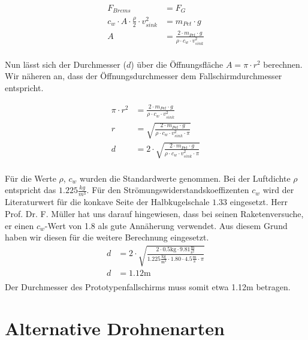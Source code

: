 \begin{equation}
\begin{split}
F_{Brems} &= F_{G} \\
c_{w} \cdot A \cdot \frac{\rho}{2} \cdot v_{sink}^{2} &= m_{Pet} \cdot g \\
A &= \frac{2 \cdot m_{Pet} \cdot g}{\rho \cdot c_{w} \cdot v_{sink}^{2} } \\
\end{split}
\end{equation}

Nun lässt sich der Durchmesser ($d$) über die Öffnungsfläche $A = \pi \cdot r^2$ berechnen. Wir näheren an, dass der Öffnungsdurchmesser dem Fallschirmdurchmesser entspricht. 

\begin{equation}
\begin{split}
\pi \cdot r^2 &= \frac{2 \cdot m_{Pet} \cdot g}{\rho \cdot c_{w} \cdot v_{sink}^{2} } \\
r &= \sqrt{\frac{2 \cdot m_{Pet} \cdot g}{\rho \cdot c_{w} \cdot v_{sink}^{2} \cdot \pi}} \\
d &= 2 \cdot \sqrt{\frac{2 \cdot m_{Pet} \cdot g}{\rho \cdot c_{w} \cdot v_{sink}^{2} \cdot \pi}} \\
\end{split}
\end{equation}

Für die Werte $\rho$, $c_w$ wurden die Standardwerte genommen. Bei der Luftdichte $\rho$ entspricht das $1.225 \frac{kg}{m^3}$. 
Für den Strömungswiderstandskoeffizenten $c_w$ wird der Literaturwert für die konkave Seite der Halbkugelschale $1.33$ eingesetzt. Herr Prof. Dr. F. Müller hat uns darauf hingewiesen, dass bei seinen Raketenversuche, er einen $c_w$-Wert von 1.8 als gute Annäherung verwendet. Aus diesem Grund haben wir diesen für die weitere Berechnung eingesetzt.
\begin{equation}
\begin{split}
d &= 2 \cdot \sqrt{\frac{2 \cdot 0.5\text{kg} \cdot  9.81\frac{\text{m}}{\text{s}^2}}{1.225 \frac{\text{kg}}{\text{m}^3} \cdot 1.80 \cdot 4.5 \frac{\text{m}}{\text{s}} \cdot \pi}} \\
d &= 1.12\text{m} \\
\end{split}
\end{equation}
Der Durchmesser des Prototypenfallschirms muss somit etwa 1.12m betragen.


\section{Alternative Drohnenarten}

